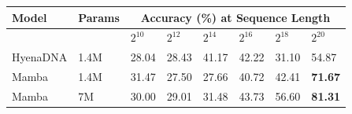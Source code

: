 \begin{tabular}{llllllll}
\hline
Model & Params & \multicolumn{6}{c}{Accuracy (\%) at Sequence Length} \\
\hline
 &  & $2^{10}$ & $2^{12}$ & $2^{14}$ & $2^{16}$ & $2^{18}$ & $2^{20}$ \\
\hline
HyenaDNA & 1.4M & 28.04 & 28.43 & 41.17 & 42.22 & 31.10 & 54.87 \\
Mamba & 1.4M & 31.47 & 27.50 & 27.66 & 40.72 & 42.41 & \textbf{71.67} \\
\hline
Mamba & 7M & 30.00 & 29.01 & 31.48 & 43.73 & 56.60 & \textbf{81.31} \\
\hline
\end{tabular}
